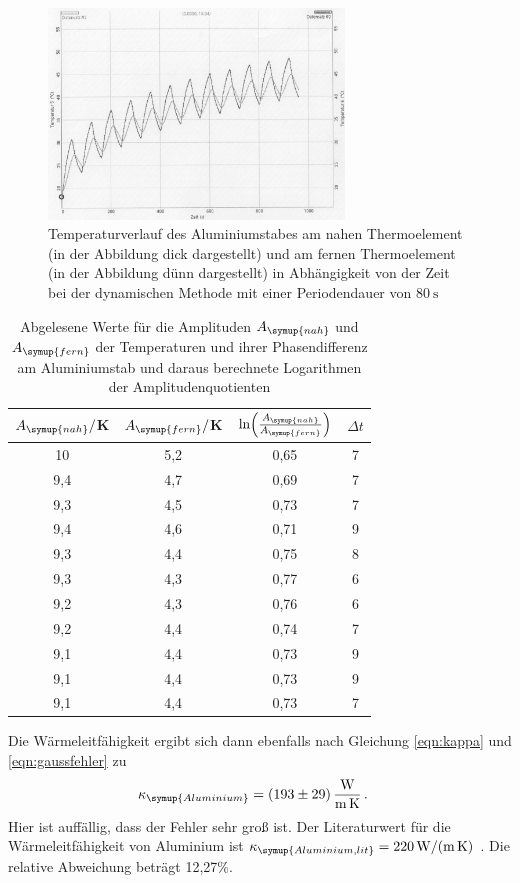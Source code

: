 \begin{figure}
  \centering
  \includegraphics[width=0.7\textwidth]{data/t5undt6_welle.JPEG}
  \caption{Temperaturverlauf des Aluminiumstabes am nahen Thermoelement (in der Abbildung dick dargestellt)
  und am fernen Thermoelement (in der Abbildung dünn dargestellt) in Abhängigkeit von der Zeit bei der
  dynamischen Methode mit einer Periodendauer von $\SI{80}{\second}$}
  \label{fig:aluminium_welle}
\end{figure}

\begin{table}
  \centering
  \caption{Abgelesene Werte für die Amplituden $A_{\symup{nah}}$ und $A_{\symup{fern}}$ der Temperaturen und
  ihrer Phasendifferenz am Aluminiumstab und daraus berechnete Logarithmen der Amplitudenquotienten}
  \label{tab:aluminium_welle}
  \begin{tabular}{c c c c}
    \toprule
     $A_{\symup{nah}}/$K  & $A_{\symup{fern}}/$K & $\ln\Bigl(\frac{A_{\symup{nah}}}{A_{\symup{fern}}}\Bigr)$ & $\Delta t$ \\
    \midrule
    10  	& 5,2  &  0,65 &  7 \\
    9,4	  & 4,7	 &  0,69 &  7 \\
    9,3	  & 4,5	 &  0,73 &  7 \\
    9,4	  & 4,6	 &  0,71 &  9 \\
    9,3	  & 4,4	 &  0,75 &  8 \\
    9,3	  & 4,3	 &  0,77 &  6 \\
    9,2	  & 4,3	 &  0,76 &  6 \\
    9,2	  & 4,4	 &  0,74 &  7 \\
    9,1	  & 4,4	 &  0,73 &  9 \\
    9,1	  & 4,4	 &  0,73 &  9 \\
    9,1	  & 4,4	 &  0,73 &  7 \\
    \bottomrule
  \end{tabular}
\end{table}
Die Wärmeleitfähigkeit ergibt sich dann ebenfalls nach Gleichung \eqref{eqn:kappa}
und \eqref{eqn:gaussfehler} zu
\begin{align}
  \kappa_{\symup{Aluminium}} &= \SI{193(29)}{\watt\per\meter\per\kelvin}\,.\nonumber
\end{align}
Hier ist auffällig, dass der Fehler sehr groß ist.
Der Literaturwert für die Wärmeleitfähigkeit von Aluminium ist
$\kappa_{\symup{Aluminium,lit}} = \SI{220}{\watt\per\meter\per\kelvin}$ \cite{Wärmeleitfähigkeit1}. Die relative
Abweichung beträgt 12,27\%.


